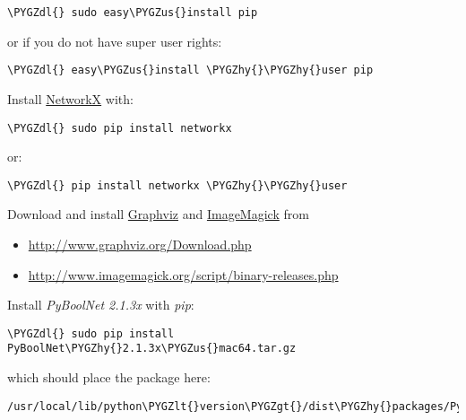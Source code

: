 \documentclass[letterpaper,10pt,english]{sphinxmanual}
\def\PYGZus{\char`\_}
\def\PYGZlt{\char`\<}
\def\PYGZgt{\char`\>}
\def\PYGZdl{\char`\$}
\def\PYGZhy{\char`\-}
\begin{document}
\begin{Verbatim}[commandchars=\\\{\}]
\PYGZdl{} sudo easy\PYGZus{}install pip
\end{Verbatim}

or if you do not have super user rights:

\begin{Verbatim}[commandchars=\\\{\}]
\PYGZdl{} easy\PYGZus{}install \PYGZhy{}\PYGZhy{}user pip
\end{Verbatim}

Install \href{https://networkx.github.io/}{NetworkX} with:

\begin{Verbatim}[commandchars=\\\{\}]
\PYGZdl{} sudo pip install networkx
\end{Verbatim}

or:

\begin{Verbatim}[commandchars=\\\{\}]
\PYGZdl{} pip install networkx \PYGZhy{}\PYGZhy{}user
\end{Verbatim}

Download and install \href{http://www.graphviz.org/}{Graphviz} and \href{http://www.imagemagick.org/script/index.php}{ImageMagick} from
\begin{itemize}
\item {} 
\href{http://www.graphviz.org/Download.php}{http://www.graphviz.org/Download.php}

\item {} 
\href{http://www.imagemagick.org/script/binary-releases.php}{http://www.imagemagick.org/script/binary-releases.php}

\end{itemize}

Install \emph{PyBoolNet 2.1.3x} with \emph{pip}:

\begin{Verbatim}[commandchars=\\\{\}]
\PYGZdl{} sudo pip install PyBoolNet\PYGZhy{}2.1.3x\PYGZus{}mac64.tar.gz
\end{Verbatim}

which should place the package here:

\begin{Verbatim}[commandchars=\\\{\}]
/usr/local/lib/python\PYGZlt{}version\PYGZgt{}/dist\PYGZhy{}packages/PyBoolNet
\end{Verbatim}
\end{document}
